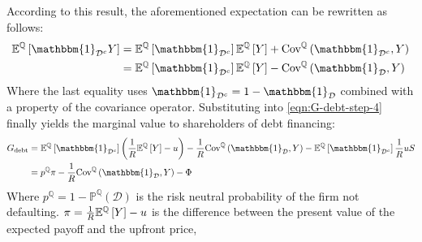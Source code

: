 \documentclass[../main.tex]{subfiles}
\begin{document}
        According to this result, the aforementioned expectation can be rewritten as follows:
            \begin{align}
                \mathbb{E}^{\mathbb{Q}}\left[
                    \mathbbm{1}_{\mathcal{D}^{c}}Y
                \right]
                &=
                \mathbb{E}^{\mathbb{Q}}\left[\mathbbm{1}_{\mathcal{D}^{c}}\right] 
                \mathbb{E}^{\mathbb{Q}}\left[Y\right] 
                + 
                \text{Cov}^{\mathbb{Q}}\left(\mathbbm{1}_{\mathcal{D}^{c}}, Y\right) 
                \nonumber\\
                &=
                \mathbb{E}^{\mathbb{Q}}\left[\mathbbm{1}_{\mathcal{D}^{c}}\right] 
                \mathbb{E}^{\mathbb{Q}}\left[Y\right] 
                - 
                \text{Cov}^{\mathbb{Q}}\left(\mathbbm{1}_{\mathcal{D}}, Y\right) 
            \end{align}
        Where the last equality uses $\mathbbm{1}_{\mathcal{D}^{c}} = 1 - \mathbbm{1}_{\mathcal{D}}$ 
        combined with a property of the covariance operator.
        Substituting into \cref{eqn:G-debt-step-4} finally yields the marginal value to shareholders of debt financing:
            \begin{align}
                G_{\text{debt}} &=
                \mathbb{E}^{\mathbb{Q}}\left[\mathbbm{1}_{\mathcal{D}^{c}}\right] 
                \left(
                    \discountfactor
                    \mathbb{E}^{\mathbb{Q}}\left[Y\right] 
                    - u
                \right)
                -
                \discountfactor
                \text{Cov}^{\mathbb{Q}}\left(\mathbbm{1}_{\mathcal{D}}, Y\right) 
                - 
                \mathbb{E}^{\mathbb{Q}}\left[
                    \mathbbm{1}_{\mathcal{D}^{c}}
                \right] \discountfactor u S
                \nonumber \\
                &= 
                p^{\mathbb{Q}} \pi 
                - \discountfactor 
                \text{Cov}^{\mathbb{Q}}\left(
                    \mathbbm{1}_{\mathcal{D}}, 
                    Y
                \right) 
                - \Phi
                \label{eqn:marginal-shareholder-value-debt-financing}
            \end{align}
        Where $p^{\mathbb{Q}} = 1 - \mathbb{P}^{\mathbb{Q}}\left(\mathcal{D}\right)$ 
        is the risk neutral probability of the firm not defaulting. 
        $\pi = \frac{1}{R} \mathbb{E}^{\mathbb{Q}}\left[Y\right] - u$ 
        is the difference between the present value of the expected payoff and the upfront price, 
\end{document}
